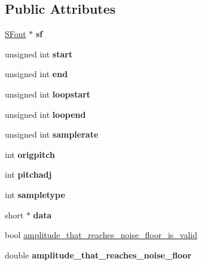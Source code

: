 \subsection*{Public Attributes}
\begin{DoxyCompactItemize}
\item 
\mbox{\label{class_fluid_s_1_1_sample_a727534c23de61ff442694af7e5be2ccd}} 
\hyperlink{class_fluid_s_1_1_s_font}{S\+Font} $\ast$ {\bfseries sf}
\item 
\mbox{\label{class_fluid_s_1_1_sample_ab05243549fcf3463f4fd02a61912f9bb}} 
unsigned int {\bfseries start}
\item 
\mbox{\label{class_fluid_s_1_1_sample_ac987d6e06245fe5e8ed6d31dbb9d5959}} 
unsigned int {\bfseries end}
\item 
\mbox{\label{class_fluid_s_1_1_sample_ae73d61a39cf4f2913818f413ad3148c4}} 
unsigned int {\bfseries loopstart}
\item 
\mbox{\label{class_fluid_s_1_1_sample_aa146f98492f1b57c5149a04dddc1a10a}} 
unsigned int {\bfseries loopend}
\item 
\mbox{\label{class_fluid_s_1_1_sample_add5e85d1c0b7a88965ebfde1e992a906}} 
unsigned int {\bfseries samplerate}
\item 
\mbox{\label{class_fluid_s_1_1_sample_a3207fa8241c23c5eb4e7b67ae0f70223}} 
int {\bfseries origpitch}
\item 
\mbox{\label{class_fluid_s_1_1_sample_a40f1dc279920d274f22143060226f6b8}} 
int {\bfseries pitchadj}
\item 
\mbox{\label{class_fluid_s_1_1_sample_a1974f7abc960b9722b8fce7134f9d55b}} 
int {\bfseries sampletype}
\item 
\mbox{\label{class_fluid_s_1_1_sample_a904da2a5be59f1fec3e9af01587f0017}} 
short $\ast$ {\bfseries data}
\item 
bool \hyperlink{class_fluid_s_1_1_sample_a0bcea34e0cf4f09a5c522b09da7cffc0}{amplitude\+\_\+that\+\_\+reaches\+\_\+noise\+\_\+floor\+\_\+is\+\_\+valid}
\item 
\mbox{\label{class_fluid_s_1_1_sample_a0de5bd2e7899697a96b077749d7daa34}} 
double {\bfseries amplitude\+\_\+that\+\_\+reaches\+\_\+noise\+\_\+floor}
\end{DoxyCompactItemize}


